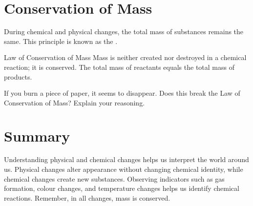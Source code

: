 \section{Conservation of Mass}

During chemical and physical changes, the total mass of substances remains the same. This principle is known as the .

\begin{keyconcept}{Law of Conservation of Mass}
Mass is neither created nor destroyed in a chemical reaction; it is conserved. The total mass of reactants equals the total mass of products.
\end{keyconcept}

\begin{stopandthink}
If you burn a piece of paper, it seems to disappear. Does this break the Law of Conservation of Mass? Explain your reasoning.
\end{stopandthink}




\section{Summary}

Understanding physical and chemical changes helps us interpret the world around us. Physical changes alter appearance without changing chemical identity, while chemical changes create new substances. Observing indicators such as gas formation, colour changes, and temperature changes helps us identify chemical reactions. Remember, in all changes, mass is conserved.